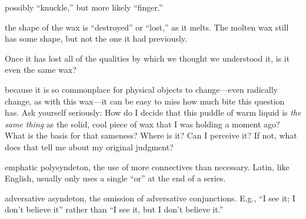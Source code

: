  possibly ``knuckle,'' but more likely ``finger.''

 the shape of the wax is ``destroyed'' or ``lost,'' as it melts. The molten wax still has some shape, but not the one it had previously.

 Once it has lost all of the qualities by which we thought we understood it, is it even the same wax?

 because it is so commonplace for physical objects to change---even radically change, as with this wax---it can be easy to miss how much bite this question has. Ask yourself seriously: How do I decide that this puddle of warm liquid is \textit{the same thing} as the solid, cool piece of wax that I was holding a moment ago? What is the basis for that sameness? Where is it? Can I perceive it? If not, what does that tell me about my original judgment?

 emphatic polysyndeton, the use of more connectives than necessary. Latin, like English, usually only uses a single ``or'' at the end of a series.

 adversative asyndeton, the omission of adversative conjunctions. E.g., ``I see it; I don't believe it'' rather than ``I see it, but I don't believe it.''

\clearpage

